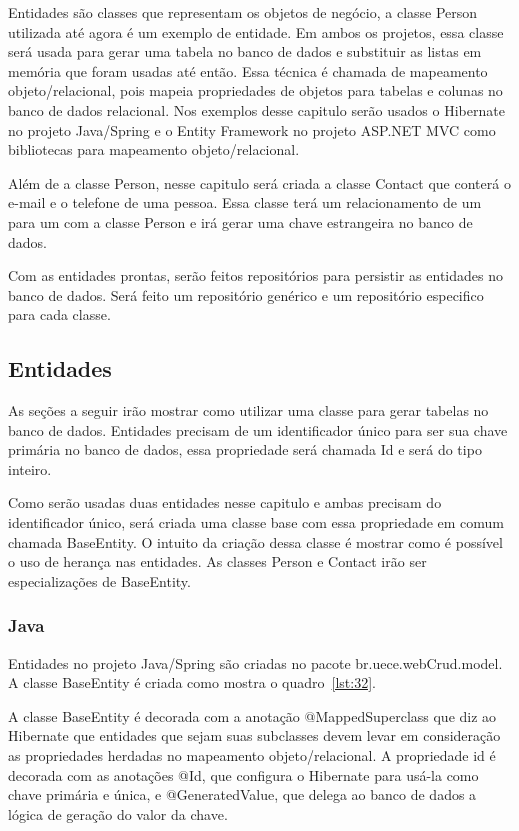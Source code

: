 \documentclass[a4paper,12pt]{article}
\newcommand{\javacode}[3] {
	
}
\begin{document}
Entidades são classes que representam os objetos de negócio, a classe Person utilizada até agora é um exemplo de entidade. Em ambos os projetos, essa classe será usada para gerar uma tabela no banco de dados e substituir as listas em memória que foram usadas até então. Essa técnica é chamada de mapeamento objeto/relacional, pois mapeia propriedades de objetos para tabelas e colunas no banco de dados relacional. Nos exemplos desse capitulo serão usados o Hibernate no projeto Java/Spring e o Entity Framework no projeto ASP.NET MVC como bibliotecas para mapeamento objeto/relacional.

Além de a classe Person, nesse capitulo será criada a classe Contact que conterá o e-mail e o telefone de uma pessoa. Essa classe terá um relacionamento de um para um com a classe Person e irá gerar uma chave estrangeira no banco de dados.

Com as entidades prontas, serão feitos repositórios para persistir as entidades no banco de dados. Será feito um repositório genérico e um repositório especifico para cada classe.

\subsection{Entidades}

As seções a seguir irão mostrar como utilizar uma classe para gerar tabelas no banco de dados. Entidades precisam de um identificador único para ser sua chave primária no banco de dados, essa propriedade será chamada Id e será do tipo inteiro.

Como serão usadas duas entidades nesse capitulo e ambas precisam do identificador único, será criada uma classe base com essa propriedade em comum chamada BaseEntity. O intuito da criação dessa classe é mostrar como é possível o uso de herança nas entidades. As classes Person e Contact irão ser especializações de BaseEntity.

\subsubsection{Java}

Entidades no projeto Java/Spring são criadas no pacote br.uece.webCrud.model. A classe BaseEntity é criada como mostra o quadro~\ref{lst:32}.

\javacode{code/32.txt}{Classe BaseEntity no projeto Java}{lst:32}

A classe BaseEntity é decorada com a anotação @MappedSuperclass que diz ao Hibernate que entidades que sejam suas subclasses devem levar em consideração as propriedades herdadas no mapeamento objeto/relacional. A propriedade id é decorada com as anotações @Id, que configura o Hibernate para usá-la como chave primária e única, e @GeneratedValue, que delega ao banco de dados a lógica de geração do valor da chave.
\end{document}
